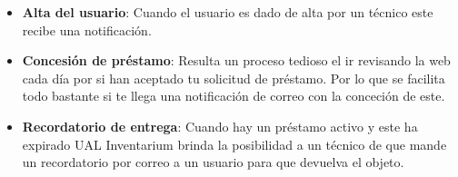 \begin{itemize}
\begin{tcolorbox}
          \end{tcolorbox}
    \item \textbf{Alta del usuario}: Cuando el usuario es dado de alta por un técnico este recibe una notificación.
    \item \textbf{Concesión de préstamo}: Resulta un proceso tedioso el ir revisando la web cada día por si han aceptado tu solicitud de préstamo. Por lo que se facilita todo bastante si te llega una notificación de correo con la conceción de este.
    \item \textbf{Recordatorio de entrega}: Cuando hay un préstamo activo y este ha expirado UAL Inventarium brinda la posibilidad a un técnico de que mande un recordatorio por correo a un usuario para que devuelva el objeto.
\end{itemize}

